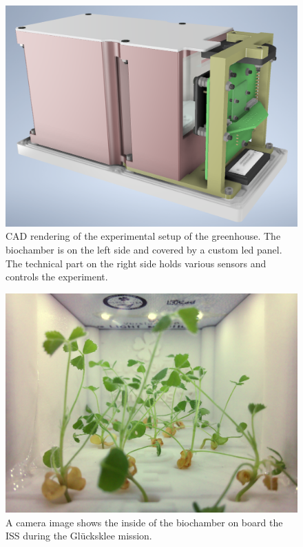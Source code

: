 \documentclass{scrartcl}
\begin{document}
\begin{figure}
    \centering
    \includegraphics[width=\textwidth]{img/experiment_setup}
    \caption{CAD rendering of the experimental setup of the greenhouse. The biochamber is on the left side and covered by a custom led panel. The technical part on the right side holds various sensors and controls the experiment.}
    \label{fig:cad}
\end{figure}
\begin{figure}
    \centering
    \includegraphics[width=\textwidth]{img/experiment_edit}  %
    \caption{A camera image shows the inside of the biochamber on board the ISS during the Glücksklee mission.}
    \label{fig:camera}
\end{figure}
\end{document}
